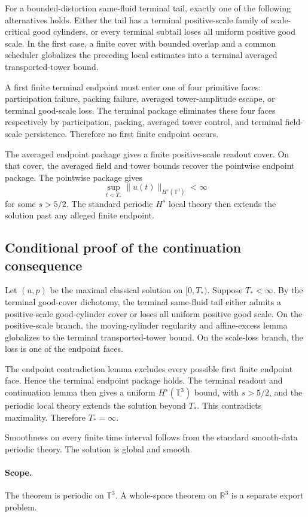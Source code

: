 \begin{lemma}
For a bounded-distortion same-fluid terminal tail, exactly one of the following alternatives holds. Either the tail has a terminal positive-scale family of scale-critical good cylinders, or every terminal subtail loses all uniform positive good scale. In the first case, a finite cover with bounded overlap and a common scheduler globalizes the preceding local estimates into a terminal averaged transported-tower bound.
\end{lemma}

\begin{lemma}
A first finite terminal endpoint must enter one of four primitive faces: participation failure, packing failure, averaged tower-amplitude escape, or terminal good-scale loss. The terminal package eliminates these four faces respectively by participation, packing, averaged tower control, and terminal field-scale persistence. Therefore no first finite endpoint occurs.
\end{lemma}

\begin{lemma}
The averaged endpoint package gives a finite positive-scale readout cover. On that cover, the averaged field and tower bounds recover the pointwise endpoint package. The pointwise package gives
\[
\sup_{t<T_*}\|u(t)\|_{H^s(\mathbb T^3)}<\infty
\]
for some \(s>5/2\). The standard periodic \(H^s\) local theory then extends the solution past any alleged finite endpoint.
\end{lemma}

\subsection{Conditional proof of the continuation consequence}

Let \((u,p)\) be the maximal classical solution on \([0,T_*)\). Suppose \(T_*<\infty\). By the terminal good-cover dichotomy, the terminal same-fluid tail either admits a positive-scale good-cylinder cover or loses all uniform positive good scale. On the positive-scale branch, the moving-cylinder regularity and affine-excess lemma globalizes to the terminal transported-tower bound. On the scale-loss branch, the loss is one of the endpoint faces.

The endpoint contradiction lemma excludes every possible first finite endpoint face. Hence the terminal endpoint package holds. The terminal readout and continuation lemma then gives a uniform \(H^s(\mathbb T^3)\) bound, with \(s>5/2\), and the periodic local theory extends the solution beyond \(T_*\). This contradicts maximality. Therefore \(T_*=\infty\).

Smoothness on every finite time interval follows from the standard smooth-data periodic theory. The solution is global and smooth.

\paragraph{Scope.}
The theorem is periodic on \(\mathbb T^3\). A whole-space theorem on \(\mathbb R^3\) is a separate export problem.
